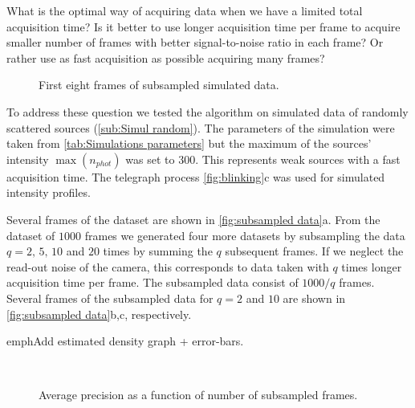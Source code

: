 What is the optimal way of acquiring data when we have a limited total acquisition time? Is it better to use longer acquisition time per frame to acquire smaller number of frames with better signal-to-noise ratio in each frame? Or rather use as fast acquisition as possible acquiring many frames? 

\begin{figure}[!htb]	
	\newcommand{\widthfig}{1\textwidth}
	\centering	
	
	
	
	\caption{First eight frames of subsampled simulated data. }
	\label{fig:subsampled data}
\end{figure} 

To address these question we tested the algorithm on simulated data of randomly scattered sources (\autoref{sub:Simul random}). The parameters of the simulation were taken from \autoref{tab:Simulations parameters} but the maximum of the sources' intensity $\max(n_{phot})$ was set to 300. This represents weak sources with a fast acquisition time. The telegraph process \autoref{fig:blinking}c was used for simulated intensity profiles. 

Several frames of the dataset are shown in \autoref{fig:subsampled data}a. From the dataset of $1000$ frames we generated four more datasets by subsampling the data $q=2,\,5,\,10$ and $20$ times by summing the $q$ subsequent frames. If  we neglect the read-out noise of the camera, this corresponds to data taken with $q$ times longer acquisition time per frame. The subsampled data consist of $1000/q$ frames. Several frames of the subsampled data for $q=2$ and $10$ are shown in \autoref{fig:subsampled data}b,c, respectively. 

\fix emph{Add estimated density graph + error-bars}.
\begin{figure}[!h]	
	\newcommand{\wf}{.9\textwidth}
	\centering
	\\
	\caption{Average precision as a function of number of subsampled frames.}
	\label{fig:AP subsampled}
\end{figure}

